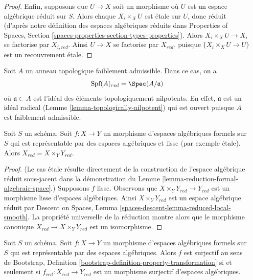 \begin{proof}
\medskip\noindent
Enfin, supposons que $U \to X$ soit un morphisme où
$U$ est un espace algébrique réduit sur $S$. Alors chaque $X_i \times_X U$
est étale sur $U$, donc réduit (d'après notre définition des
espaces algébriques réduits dans Properties of Spaces, Section
\ref{spaces-properties-section-types-properties}).
Alors $X_i \times_X U \to X_i$ se factorise par $X_{i, red}$.
Ainsi $U \to X$ se factorise par $X_{red}$, puisque
$\{X_i \times_X U \to U\}$ est un recouvrement étale.
\end{proof}

\begin{example}
\label{example-reduction-affine-formal-spectrum}
Soit $A$ un anneau topologique faiblement admissible. Dans ce cas, on a
$$
\text{Spf}(A)_{red} = \Spec(A/\mathfrak a)
$$
où $\mathfrak a \subset A$ est l'idéal des éléments topologiquement
nilpotents. En effet, $\mathfrak a$ est un idéal radical
(Lemme \ref{lemma-topologically-nilpotent})
qui est ouvert puisque $A$ est faiblement admissible.
\end{example}

\begin{lemma}
\label{lemma-reduction-smooth}
Soit $S$ un schéma. Soit $f : X \to Y$ un morphisme d'espaces
algébriques formels sur $S$ qui est représentable par des
espaces algébriques et lisse (par exemple étale).
Alors $X_{red} = X \times_Y Y_{red}$.
\end{lemma}

\begin{proof}
(Le cas étale résulte directement de la construction de
l'espace algébrique réduit sous-jacent dans la démonstration du
Lemme \ref{lemma-reduction-formal-algebraic-space}.)
Supposons $f$ lisse. Observons que $X \times_Y Y_{red} \to Y_{red}$
est un morphisme lisse d'espaces algébriques. Ainsi $X \times_Y Y_{red}$
est un espace algébrique réduit par Descent on Spaces, Lemma
\ref{spaces-descent-lemma-reduced-local-smooth}.
La propriété universelle de la réduction montre alors que le morphisme canonique
$X_{red} \to X \times_Y Y_{red}$ est un isomorphisme.
\end{proof}

\begin{lemma}
\label{lemma-reduction-surjective}
Soit $S$ un schéma. Soit $f : X \to Y$ un morphisme d'espaces
algébriques formels sur $S$ qui est représentable par des
espaces algébriques. Alors $f$ est surjectif au sens de
Bootstrap, Definition \ref{bootstrap-definition-property-transformation}
si et seulement si $f_{red} : X_{red} \to Y_{red}$ est un
morphisme surjectif d'espaces algébriques.
\end{lemma}

